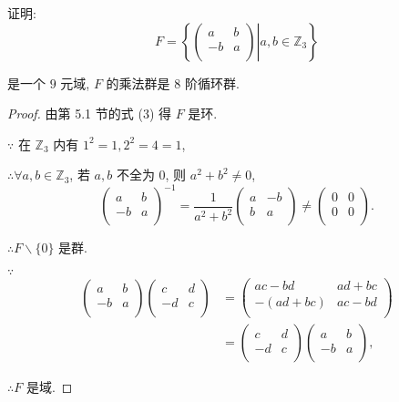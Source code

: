\documentclass{ctexart}
\begin{document}
\begin{exercise}[3.11]
    证明:
    \[F=\left\{\left.\begin{pmatrix}
        a & b \\
        -b & a \\
    \end{pmatrix}\right|a,b\in\mathbb{Z}_3\right\}\]

    是一个 $9$ 元域, $F$ 的乘法群是 $8$ 阶循环群.
\end{exercise}
\begin{proof}%
    由第 5.1 节的式 (3) 得 $F$ 是环.

    $\because$ 在 $\mathbb{Z}_3$ 内有 $1^2=1,2^2=4=1$,

    $\therefore\forall a,b\in\mathbb{Z}_3$, 若 $a,b$ 不全为 $0$, 则 $a^2+b^2\neq0$,
    \[\begin{pmatrix}
        a & b \\
        -b & a \\
    \end{pmatrix}^{-1}=\dfrac{1}{a^2+b^2}\begin{pmatrix}
        a & -b \\
        b & a \\
    \end{pmatrix}\neq\begin{pmatrix}
        0 & 0 \\
        0 & 0 \\
    \end{pmatrix}.\]

    $\therefore F\backslash\{0\}$ 是群.

    $\because$
    \begin{align*}
        \begin{pmatrix}
            a & b \\
            -b & a \\
        \end{pmatrix}\begin{pmatrix}
            c & d \\
            -d & c \\
        \end{pmatrix} & =\begin{pmatrix}
                            ac-bd & ad+bc \\
                            -(ad+bc) & ac-bd \\
                        \end{pmatrix} \\
        & =\begin{pmatrix}
            c & d \\
            -d & c \\
        \end{pmatrix}\begin{pmatrix}
            a & b \\
            -b & a \\
        \end{pmatrix},
    \end{align*}

    $\therefore F$ 是域.
\end{proof}
\end{document}

